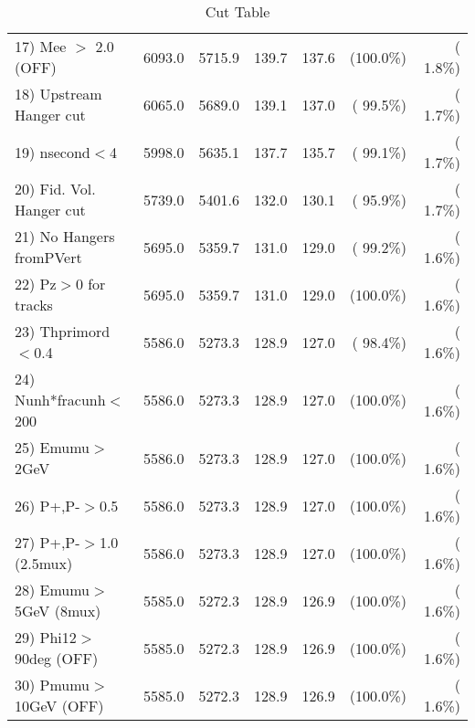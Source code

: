 \begin{table}[h!]
\begin{tabular}{||l||r|r|r|r|r|r||}
 17) Mee $>$ 2.0  (OFF)   &       6093.0 &       5715.9 &        139.7 &        137.6 & (100.0\%) & (  1.8\%) \\
 18) Upstream Hanger cut  &       6065.0 &       5689.0 &        139.1 &        137.0 & ( 99.5\%) & (  1.7\%) \\
 19) nsecond$<$4          &       5998.0 &       5635.1 &        137.7 &        135.7 & ( 99.1\%) & (  1.7\%) \\
 20) Fid. Vol. Hanger cut &       5739.0 &       5401.6 &        132.0 &        130.1 & ( 95.9\%) & (  1.7\%) \\
 21) No Hangers fromPVert &       5695.0 &       5359.7 &        131.0 &        129.0 & ( 99.2\%) & (  1.6\%) \\
 22) Pz$>$0 for tracks    &       5695.0 &       5359.7 &        131.0 &        129.0 & (100.0\%) & (  1.6\%) \\
 23) Thprimord$<$0.4      &       5586.0 &       5273.3 &        128.9 &        127.0 & ( 98.4\%) & (  1.6\%) \\
 24) Nunh*fracunh$<$200   &       5586.0 &       5273.3 &        128.9 &        127.0 & (100.0\%) & (  1.6\%) \\
 25) Emumu$>$2GeV         &       5586.0 &       5273.3 &        128.9 &        127.0 & (100.0\%) & (  1.6\%) \\
 26) P+,P-$>$0.5          &       5586.0 &       5273.3 &        128.9 &        127.0 & (100.0\%) & (  1.6\%) \\
 27) P+,P-$>$1.0 (2.5mux) &       5586.0 &       5273.3 &        128.9 &        127.0 & (100.0\%) & (  1.6\%) \\
 28) Emumu$>$5GeV  (8mux) &       5585.0 &       5272.3 &        128.9 &        126.9 & (100.0\%) & (  1.6\%) \\
 29) Phi12$>$90deg  (OFF) &       5585.0 &       5272.3 &        128.9 &        126.9 & (100.0\%) & (  1.6\%) \\
 30) Pmumu$>$10GeV  (OFF) &       5585.0 &       5272.3 &        128.9 &        126.9 & (100.0\%) & (  1.6\%) \\
 \hline
 \hline
 \end{tabular}
 \caption{Cut Table           }
 \label{tab-cutcohjpsi-mumu_cohpip}
 \end{table}
